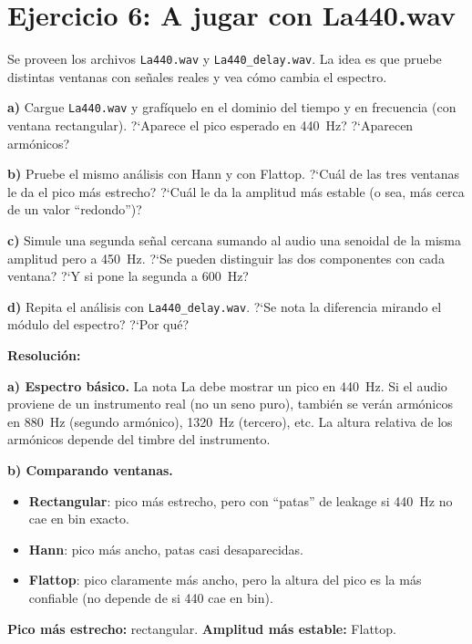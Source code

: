 \documentclass[11pt, a4paper]{article}
\newcommand{\res}{\smallskip\noindent\textbf{\color{enunline}Resoluci\'on:}\smallskip}
\begin{document}
\section*{Ejercicio 6: A jugar con La440.wav}

\begin{enun}
Se proveen los archivos \texttt{La440.wav} y \texttt{La440\_delay.wav}.
La idea es que pruebe distintas ventanas con se\~nales reales y vea c\'omo
cambia el espectro.

\textbf{a)} Cargue \texttt{La440.wav} y graf\'iquelo en el dominio del tiempo
y en frecuencia (con ventana rectangular).
?`Aparece el pico esperado en 440~Hz? ?`Aparecen arm\'onicos?

\textbf{b)} Pruebe el mismo an\'alisis con Hann y con Flattop.
?`Cu\'al de las tres ventanas le da el pico m\'as estrecho?
?`Cu\'al le da la amplitud m\'as estable (o sea, m\'as cerca de un valor
``redondo'')?

\textbf{c)} Simule una segunda se\~nal cercana sumando al audio una
senoidal de la misma amplitud pero a 450~Hz.
?`Se pueden distinguir las dos componentes con cada ventana?
?`Y si pone la segunda a 600~Hz?

\textbf{d)} Repita el an\'alisis con \texttt{La440\_delay.wav}.
?`Se nota la diferencia mirando el m\'odulo del espectro?
?`Por qu\'e?
\end{enun}

\res

\textbf{a) Espectro b\'asico.}
La nota La debe mostrar un pico en 440~Hz.
Si el audio proviene de un instrumento real (no un seno puro), tambi\'en se
ver\'an arm\'onicos en 880~Hz (segundo arm\'onico), 1320~Hz (tercero), etc.
La altura relativa de los arm\'onicos depende del timbre del instrumento.

\textbf{b) Comparando ventanas.}
\begin{itemize}
  \item \textbf{Rectangular}: pico m\'as estrecho, pero con ``patas'' de leakage si 440~Hz no cae en bin exacto.
  \item \textbf{Hann}: pico m\'as ancho, patas casi desaparecidas.
  \item \textbf{Flattop}: pico claramente m\'as ancho, pero la altura del pico
    es la m\'as confiable (no depende de si 440 cae en bin).
\end{itemize}

\textbf{Pico m\'as estrecho:} rectangular.
\textbf{Amplitud m\'as estable:} Flattop.
\end{document}
